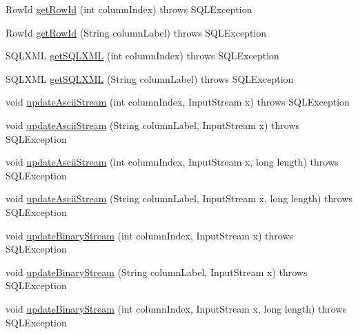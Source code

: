 \begin{DoxyCompactItemize}
\item 
Row\+Id \mbox{\hyperlink{classcom_1_1mysql_1_1cj_1_1jdbc_1_1result_1_1_result_set_impl_af290d66ffbdd57b6123ca8d2cdda412a}{get\+Row\+Id}} (int column\+Index)  throws S\+Q\+L\+Exception 
\item 
Row\+Id \mbox{\hyperlink{classcom_1_1mysql_1_1cj_1_1jdbc_1_1result_1_1_result_set_impl_a10a1ac488e017856ab8f35bf36559990}{get\+Row\+Id}} (String column\+Label)  throws S\+Q\+L\+Exception 
\item 
S\+Q\+L\+X\+ML \mbox{\hyperlink{classcom_1_1mysql_1_1cj_1_1jdbc_1_1result_1_1_result_set_impl_a7104035f041ddff5ee887c9aff25eac9}{get\+S\+Q\+L\+X\+ML}} (int column\+Index)  throws S\+Q\+L\+Exception 
\item 
S\+Q\+L\+X\+ML \mbox{\hyperlink{classcom_1_1mysql_1_1cj_1_1jdbc_1_1result_1_1_result_set_impl_a2a52722c2a7bc7658383c871dad6dee5}{get\+S\+Q\+L\+X\+ML}} (String column\+Label)  throws S\+Q\+L\+Exception 
\item 
void \mbox{\hyperlink{classcom_1_1mysql_1_1cj_1_1jdbc_1_1result_1_1_result_set_impl_acf9f583768c60872f1ca064bfd170814}{update\+Ascii\+Stream}} (int column\+Index, Input\+Stream x)  throws S\+Q\+L\+Exception 
\item 
void \mbox{\hyperlink{classcom_1_1mysql_1_1cj_1_1jdbc_1_1result_1_1_result_set_impl_abd5f6b366f93c7943d95ee37762bbced}{update\+Ascii\+Stream}} (String column\+Label, Input\+Stream x)  throws S\+Q\+L\+Exception 
\item 
void \mbox{\hyperlink{classcom_1_1mysql_1_1cj_1_1jdbc_1_1result_1_1_result_set_impl_a161f671650a74e14d32b7e9a482a4f5b}{update\+Ascii\+Stream}} (int column\+Index, Input\+Stream x, long length)  throws S\+Q\+L\+Exception 
\item 
void \mbox{\hyperlink{classcom_1_1mysql_1_1cj_1_1jdbc_1_1result_1_1_result_set_impl_a0b4e47d93b17503c4b866f5d03f20d16}{update\+Ascii\+Stream}} (String column\+Label, Input\+Stream x, long length)  throws S\+Q\+L\+Exception 
\item 
void \mbox{\hyperlink{classcom_1_1mysql_1_1cj_1_1jdbc_1_1result_1_1_result_set_impl_ac553364d96f90c4f14ec4a8f6964f78b}{update\+Binary\+Stream}} (int column\+Index, Input\+Stream x)  throws S\+Q\+L\+Exception 
\item 
void \mbox{\hyperlink{classcom_1_1mysql_1_1cj_1_1jdbc_1_1result_1_1_result_set_impl_a88c925cbbaa7153961399ca0dd45cb0c}{update\+Binary\+Stream}} (String column\+Label, Input\+Stream x)  throws S\+Q\+L\+Exception 
\item 
void \mbox{\hyperlink{classcom_1_1mysql_1_1cj_1_1jdbc_1_1result_1_1_result_set_impl_aef16da9a4df388c6034e76718f9b2dfa}{update\+Binary\+Stream}} (int column\+Index, Input\+Stream x, long length)  throws S\+Q\+L\+Exception 

\end{DoxyCompactItemize}

